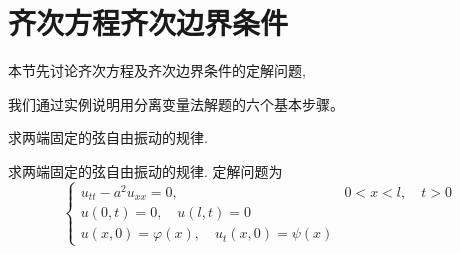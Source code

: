 \section{齐次方程齐次边界条件}
\label{sec:homo}
本节先讨论齐次方程及齐次边界条件的定解问题,


我们通过实例说明用分离变量法解题的六个基本步骤。

\begin{example}
求两端固定的弦自由振动的规律.
\end{example}

求两端固定的弦自由振动的规律.
定解问题为
\begin{equation}
    \begin{cases}u_{t t}-a^{2} u_{x x}=0, & 0<x<l, \quad t>0 
        \\ u(0, t)=0, \quad u(l, t)=0 & 
        \\ u(x, 0)=\varphi(x), \quad u_{t}(x, 0)=\psi(x) & 
    \end{cases}
    \label{eq:string_vibration_equation}
\end{equation}

